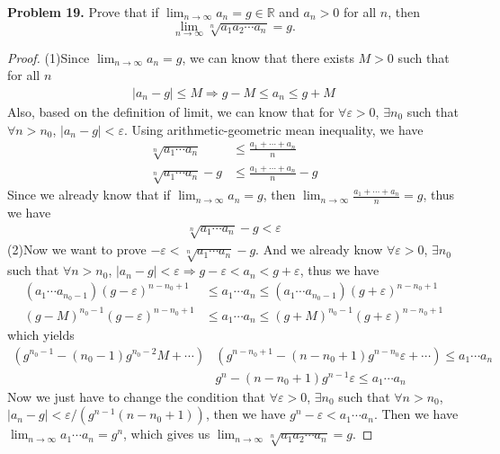 \documentclass[12pt,leqno]{amsart}
\begin{document}
\noindent
{\bf Problem 19.}
Prove that if $\lim_{n\to\infty} a_n = g\in\mathbb{R}$ and $a_n>0$ for all $n$, then
$$
\lim_{n\to\infty} \sqrt[n]{a_1a_2\cdots a_n} = g.
$$
\begin{proof}
(1)Since $\lim_{n\to\infty} a_n = g$, we can know that there exists $M > 0$ such that for all $n$
\begin{align*}
    | a_n - g | \leq M \Rightarrow g - M \leq a_n \leq g + M
\end{align*}
Also, based on the definition of limit, we can know that for $\forall \varepsilon > 0$, $\exists n_0$ such that $\forall n > n_0$, $| a_n - g | < \varepsilon$. Using arithmetic-geometric mean inequality, we have
\begin{align*}
    \sqrt[n]{a_1 \cdots a_n} & \leq \frac{a_1 + \cdots + a_n}{n} \\
    \sqrt[n]{a_1 \cdots a_n} - g & \leq \frac{a_1 + \cdots + a_n}{n} - g 
\end{align*}
Since we already know that if $\lim_{n\to\infty} a_n = g$, then $\lim_{n\to\infty} \frac{a_1 + \cdots + a_n}{n} = g$, thus we have 
\begin{align*}
    \sqrt[n]{a_1 \cdots a_n} - g < \varepsilon
\end{align*}
\hspace*{2em}(2)Now we want to prove $- \varepsilon < \sqrt[n]{a_1 \cdots a_n} - g$. And we already know $\forall \varepsilon > 0$, $\exists n_0$ such that $\forall n > n_0$, $| a_n - g | < \varepsilon \Rightarrow g-\varepsilon < a_n < g+\varepsilon$, thus we have
\begin{align*}
    (a_1 \cdots a_{n_0-1})(g-\varepsilon)^{n-n_0+1} & \leq a_1 \cdots a_n \leq (a_1 \cdots a_{n_0-1})(g+\varepsilon)^{n-n_0+1} \\
    (g-M)^{n_0-1} (g-\varepsilon)^{n-n_0+1} & \leq a_1 \cdots a_n \leq (g+M)^{n_0-1} (g+\varepsilon)^{n-n_0+1}
\end{align*}
which yields
\begin{align*}
    (g^{n_0-1} - (n_0-1)g^{n_0-2}M + \cdots) & (g^{n-n_0+1} - (n-n_0+1)g^{n-n_0}\varepsilon + \cdots) \leq a_1 \cdots a_n \\
    & g^n - (n-n_0+1)g^{n-1}\varepsilon \leq a_1 \cdots a_n
\end{align*}
Now we just have to change the condition that $\forall \varepsilon > 0$, $\exists n_0$ such that $\forall n > n_0$, $ | a_n - g | < \varepsilon/ \left( g^{n-1}(n-n_0+1) \right)$, then we have $g^n - \varepsilon < a_1 \cdots a_n$. Then we have $\lim_{n\rightarrow \infty} a_1 \cdots a_n = g^n$, which gives us $\lim_{n\to\infty} \sqrt[n]{a_1a_2\cdots a_n} = g$.
\end{proof}
\end{document}
